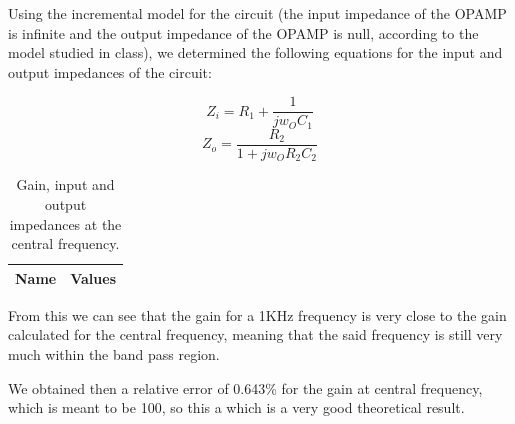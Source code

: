 Using the incremental model for the circuit (the input impedance of the OPAMP is infinite and the output impedance of the OPAMP is null, according to the model studied in class), we determined the following equations for the input and output impedances of the circuit:

\begin{equation}
Z_i = R_1 + \frac{1}{jw_{O}C_{1}}
\end{equation}
\begin{equation}
Z_o = \frac{R_2}{1+jw_OR_2C_2}
\end{equation}

\begin{table}[h!]
  \centering
  \begin{tabular}{|l|r|}
    \hline    
    {\bf Name} & {\bf Values} \\ \hline
     
  \end{tabular}
  \caption{Gain, input and output impedances at the central frequency.}
  \label{tab:data}
\end{table}

From this we can see that the gain for a 1KHz frequency is very close to the gain calculated for the central frequency, meaning that the said frequency is still very much within the band pass region.

We obtained then a relative error of 0.643\% for the gain at central frequency, which is meant to be 100, so this a 
which is a very good theoretical result.
